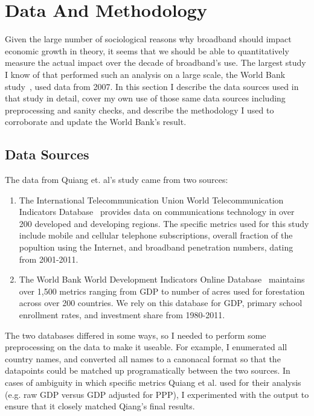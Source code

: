 \section{Data And Methodology}
\label{sec:data_and_methodology}

Given the large number of sociological reasons why broadband should impact
economic growth in theory, it seems that we should be able to quantitatively
measure the actual impact over the decade of broadband's use. The largest study I
know of that performed such an analysis on a large scale,
the World Bank study~\cite{qiang2009economic}, used data from 2007.
In this section I describe the data sources used in that study in detail,
cover my own use of those same data sources including preprocessing and sanity
checks, and describe the methodology I used to corroborate and update
the World Bank's result.

\subsection{Data Sources}

The data from Quiang et. al's study came from two sources:
\begin{enumerate}
\item The International Telecommunication Union World Telecommunication Indicators
Database~\cite{itu} provides data on communications technology in over 200
developed and developing regions. The specific metrics used for this study
include mobile and cellular telephone subscriptions, overall fraction of the
popultion using the Internet, and broadband penetration numbers, dating from
2001-2011.
\item The World Bank World Development Indicators Online Database~\cite{wdi}
maintains over 1,500 metrics ranging from GDP to number of acres used for
forestation across over 200 countries. We rely on this database for GDP, primary school enrollment
rates, and investment share from 1980-2011.
\end{enumerate}

The two databases differed in some ways, so I needed to perform some
preprocessing on the data to make it useable. For example, I enumerated all
country names, and converted all names to a canonacal format so that the
datapoints could be matched up programatically between the two sources. In
cases of ambiguity in which specific metrics Quiang et al. used for their
analysis (e.g. raw GDP versus GDP adjusted for PPP), I experimented with the
output to ensure that it closely matched Qiang's final results.


